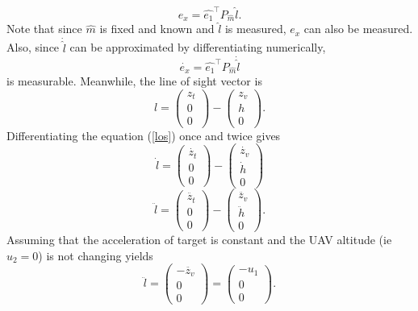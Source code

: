 \begin{equation}
e_x=\hat{e_1}^{\top}P_{\hat{m}}\hat{l}.
\end{equation}
Note that since $\hat{m}$ is fixed and known and $\hat{l}$ is measured, $e_x$ can also be measured. Also, since $\dot{\hat{l}}$ can be approximated by differentiating numerically,
\begin{equation}
\dot{e_x}=\hat{e_1}^{\top}P_{\hat{m}}\dot{\hat{l}}
\label{exdot}
\end{equation} is measurable.
Meanwhile, the line of sight vector is
\begin{equation}
l=\begin{pmatrix} z_t \\ 0 \\ 0 \end{pmatrix}
-\begin{pmatrix} z_v \\ h \\ 0 \end{pmatrix}.
\label{los}
\end{equation}
Differentiating the equation (\ref{los}) once and twice gives 
\begin{equation}
\dot{l}=\begin{pmatrix} \dot{z_t} \\ 0 \\ 0 \end{pmatrix}
-\begin{pmatrix} \dot{z_v} \\ \dot{h} \\ 0 \end{pmatrix}
\end{equation}
\begin{equation}
\ddot{l}=\begin{pmatrix} \ddot{z_t} \\ 0 \\ 0 \end{pmatrix}
-\begin{pmatrix} \ddot{z_v} \\ \ddot{h} \\ 0 \end{pmatrix}.
\end{equation}
Assuming that the acceleration of target is constant and the UAV altitude (ie $u_2=0$) is not changing yields
\begin{equation}
\ddot{l}=\begin{pmatrix} -\ddot{z_v} \\ 0 \\ 0 \end{pmatrix}
=\begin{pmatrix} -u_1 \\ 0 \\ 0 \end{pmatrix}.
\label{lddot}
\end{equation}
